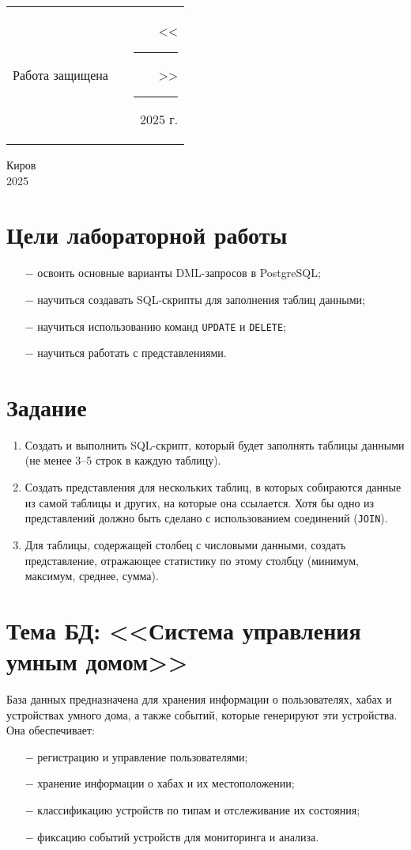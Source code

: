 \documentclass[oneside,a4paper,14pt]{extarticle}
\begin{document}
\noindent
\begin{tabular}{lp{58mm}r}
  Работа защищена &  & \hspace{13mm}<<\rule[-1mm]{5mm}{0.10mm}\/>>\rule[-1mm]{30mm}{0.10mm}\ 2025 г.
\end{tabular}
\vfill

\begin{center}
  Киров\\
  2025
\end{center}

\newpage\thispagestyle{plain}

\section*{Цели лабораторной работы}
\begin{itemize}
  \item[$-$] освоить основные варианты DML-запросов в PostgreSQL;
  \item[$-$] научиться создавать SQL-скрипты для заполнения таблиц данными;
  \item[$-$] научиться использованию команд \texttt{UPDATE} и \texttt{DELETE};
  \item[$-$] научиться работать с представлениями.
\end{itemize}

\section*{Задание}
\begin{enumerate}
  \item Создать и выполнить SQL-скрипт, который будет заполнять таблицы данными (не менее 3–5 строк в каждую таблицу).
  \item Создать представления для нескольких таблиц, в которых собираются данные из самой таблицы и других, на которые она ссылается. Хотя бы одно из представлений должно быть сделано с использованием соединений (\texttt{JOIN}).
  \item Для таблицы, содержащей столбец с числовыми данными, создать представление, отражающее статистику по этому столбцу (минимум, максимум, среднее, сумма).
\end{enumerate}

\clearpage
\section*{Тема БД: <<Система управления умным домом>>}
База данных предназначена для хранения информации о пользователях, хабах и устройствах умного дома, а также событий, которые генерируют эти устройства. Она обеспечивает:
\begin{itemize}
  \item[$-$] регистрацию и управление пользователями;
  \item[$-$] хранение информации о хабах и их местоположении;
  \item[$-$] классификацию устройств по типам и отслеживание их состояния;
  \item[$-$] фиксацию событий устройств для мониторинга и анализа.
\end{itemize}
\end{document}

